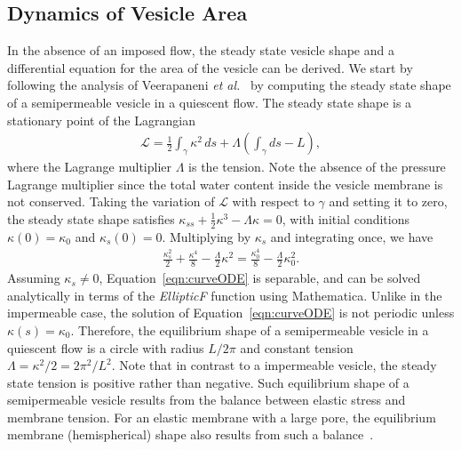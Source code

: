 \documentclass[prb,preprint,showpacs,preprintnumbers,amsmath,amssymb,longbibliography]{revtex4-1}
\begin{document}
\subsection{Dynamics of Vesicle Area\label{subsec:area_dynamics}}
In the absence of an imposed flow, the steady state vesicle shape and a
differential equation for the area of the vesicle can be derived. We
start by following the analysis of Veerapaneni {\em et
al.}~\cite{vee-raj-bir-pur2009} by computing the steady state shape of a
semipermeable vesicle in a quiescent flow. The steady state shape is a
stationary point of the Lagrangian
\begin{align}
  \mathcal{L} = \frac{1}{2}\int_{\gamma} \kappa^2 \, ds +
    \Lambda \left(\int_{\gamma} ds  - L \right),
\end{align}
where the Lagrange multiplier $\Lambda$ is the tension. Note the absence
of the pressure Lagrange multiplier since the total water content inside the vesicle membrane is not conserved.
Taking the variation of $\mathcal{L}$ with respect to $\gamma$ and
setting it to zero, the steady state shape satisfies $\kappa_{ss} +
\frac{1}{2}\kappa^3 - \Lambda \kappa = 0$, with initial conditions
$\kappa(0) = \kappa_0$ and $\kappa_s(0) = 0$.  Multiplying by $\kappa_s$
and integrating once, we have
\begin{align}
  \frac{\kappa_s^2}{2} + \frac{\kappa^4}{8} - 
    \frac{\Lambda}{2}\kappa^2 = \frac{\kappa_0^4}{8} - 
    \frac{\Lambda}{2}\kappa_0^2.
  \label{eqn:curveODE}
\end{align}
Assuming $\kappa_s \neq 0$, Equation~\eqref{eqn:curveODE} is separable,
and can be solved analytically in terms of the {\em EllipticF} function
using Mathematica. Unlike in the impermeable case, the solution of
Equation~\eqref{eqn:curveODE} is not periodic unless $\kappa(s) =
\kappa_0$. Therefore, the equilibrium shape of a semipermeable vesicle
in a quiescent flow is a circle with radius $L/2\pi$ and constant
tension $\Lambda = \kappa^2/2 = 2\pi^2/L^2.$ Note that in contrast to a
impermeable vesicle, the steady state tension is positive rather than
negative. Such equilibrium shape of a semipermeable vesicle results from
the balance between elastic stress and membrane tension. For an elastic
membrane with a large pore, the equilibrium membrane (hemispherical)
shape also results from such a balance~\cite{Ryham2018_JFM}.
\end{document}
